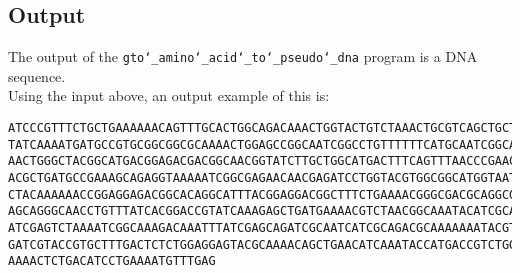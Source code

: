 \subsection*{Output}

The output of the \texttt{gto\char`_amino\char`_acid\char`_to\char`_pseudo\char`_dna} program is a DNA sequence.\\
Using the input above, an output example of this is:
\begin{lstlisting}
ATCCCGTTTCTGCTGAAAAAACAGTTTGCACTGGCAGACAAACTGGTACTGTCTAAACTGCGTCAGCTGCTGGGCGGCCG
TATCAAAATGATGCCGTGCGGCGGCGCAAAACTGGAGCCGGCAATCGGCCTGTTTTTTCATGCAATCGGCATCAACATCA
AACTGGGCTACGGCATGACGGAGACGACGGCAACGGTATCTTGCTGGCATGACTTTCAGTTTAACCCGAACTCTATCGGC
ACGCTGATGCCGAAAGCAGAGGTAAAAATCGGCGAGAACAACGAGATCCTGGTACGTGGCGGCATGGTAATGAAAGGCTA
CTACAAAAAACCGGAGGAGACGGCACAGGCATTTACGGAGGACGGCTTTCTGAAAACGGGCGACGCAGGCGAGTTTGACG
AGCAGGGCAACCTGTTTATCACGGACCGTATCAAAGAGCTGATGAAAACGTCTAACGGCAAATACATCGCACCGCAGTAC
ATCGAGTCTAAAATCGGCAAAGACAAATTTATCGAGCAGATCGCAATCATCGCAGACGCAAAAAAATACGTATCTGCACT
GATCGTACCGTGCTTTGACTCTCTGGAGGAGTACGCAAAACAGCTGAACATCAAATACCATGACCGTCTGGAGCTGCTGA
AAAACTCTGACATCCTGAAAATGTTTGAG
\end{lstlisting}
